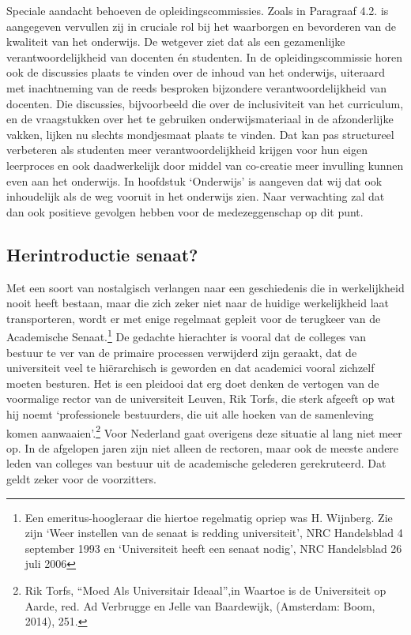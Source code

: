 \documentclass[empirical, authordate, ]{new-jote-article}
\begin{document}
	Speciale aandacht behoeven de opleidingscommissies. Zoals in Paragraaf 4.2. is aangegeven vervullen zij in cruciale rol bij het waarborgen en bevorderen van de kwaliteit van het onderwijs. De wetgever ziet dat als een gezamenlijke verantwoordelijkheid van docenten én studenten. In de opleidingscommissie horen ook de discussies plaats te vinden over de inhoud van het onderwijs, uiteraard met inachtneming van de reeds besproken bijzondere verantwoordelijkheid van docenten. Die discussies, bijvoorbeeld die over de inclusiviteit van het curriculum, en de vraagstukken over het te gebruiken onderwijsmateriaal in de afzonderlijke vakken, lijken nu slechts mondjesmaat plaats te vinden. Dat kan pas structureel verbeteren als studenten meer verantwoordelijkheid krijgen voor hun eigen leerproces en ook daadwerkelijk door middel van co-creatie meer invulling kunnen even aan het onderwijs. In hoofdstuk ‘Onderwijs' is aangeven dat wij dat ook inhoudelijk als de weg vooruit in het onderwijs zien. Naar verwachting zal dat dan ook positieve gevolgen hebben voor de medezeggenschap op dit punt.



	\subsection{Herintroductie senaat?}



	Met een soort van nostalgisch verlangen naar een geschiedenis die in werkelijkheid nooit heeft bestaan, maar die zich zeker niet naar de huidige werkelijkheid laat transporteren, wordt er met enige regelmaat gepleit voor de terugkeer van de Academische Senaat.\footnote{Een emeritus-hoogleraar die hiertoe regelmatig opriep was H. Wijnberg. Zie zijn ‘Weer instellen van de senaat is redding universiteit', NRC Handelsblad 4 september 1993 en ‘Universiteit heeft een senaat nodig', NRC Handelsblad 26 juli 2006} De gedachte hierachter is vooral dat de colleges van bestuur te ver van de primaire processen verwijderd zijn geraakt, dat de universiteit veel te hiërarchisch is geworden en dat academici vooral zichzelf moeten besturen. Het is een pleidooi dat erg doet denken de vertogen van de voormalige rector van de universiteit Leuven, Rik Torfs, die sterk afgeeft op wat hij noemt ‘professionele bestuurders, die uit alle hoeken van de samenleving komen aanwaaien'.\footnote{Rik Torfs, “Moed Als Universitair Ideaal”,in Waartoe is de Universiteit op Aarde, red. Ad Verbrugge en Jelle van Baardewijk, (Amsterdam: Boom, 2014), 251. } Voor Nederland gaat overigens deze situatie al lang niet meer op. In de afgelopen jaren zijn niet alleen de rectoren, maar ook de meeste andere leden van colleges van bestuur uit de academische gelederen gerekruteerd. Dat geldt zeker voor de voorzitters.
\end{document}
